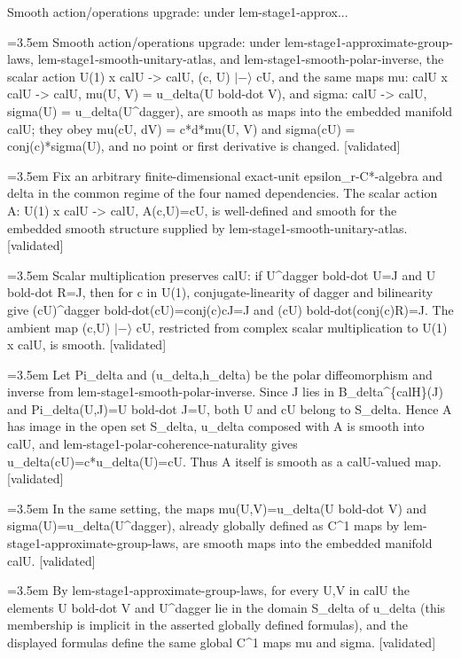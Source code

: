 \documentclass{article}
\newcommand{\step}[1]{\par\noindent\hangindent=3.5em\hangafter=1%
  \makebox[3.5em][l]{\textbf{#1.}}}
\newcommand{\steptag}[1]{\hfill{\small\textsf{[#1]}}}
\begin{document}
\begin{proofbox}{Smooth action/operations upgrade: under lem-stage1-approx...}
\step{1} Smooth action/operations upgrade: under lem-stage1-approximate-group-laws, lem-stage1-smooth-unitary-atlas, and lem-stage1-smooth-polar-inverse, the scalar action U(1) x calU -> calU, (c, U) $|-\rangle$ cU, and the same maps mu: calU x calU -> calU, mu(U, V) = u\_delta(U bold-dot V), and sigma: calU -> calU, sigma(U) = u\_delta(U\textasciicircum{}dagger), are smooth as maps into the embedded manifold calU; they obey mu(cU, dV) = c*d*mu(U, V) and sigma(cU) = conj(c)*sigma(U), and no point or first derivative is changed. \steptag{validated} \\[6pt]
\step{1.1} Fix an arbitrary finite-dimensional exact-unit epsilon\_r-C*-algebra and delta in the common regime of the four named dependencies. The scalar action A: U(1) x calU -> calU, A(c,U)=cU, is well-defined and smooth for the embedded smooth structure supplied by lem-stage1-smooth-unitary-atlas. \steptag{validated} \\[6pt]
\step{1.1.1} Scalar multiplication preserves calU: if U\textasciicircum{}dagger bold-dot U=J and U bold-dot R=J, then for c in U(1), conjugate-linearity of dagger and bilinearity give (cU)\textasciicircum{}dagger bold-dot(cU)=conj(c)cJ=J and (cU) bold-dot(conj(c)R)=J. The ambient map (c,U) $|-\rangle$ cU, restricted from complex scalar multiplication to U(1) x calU, is smooth. \steptag{validated} \\[4pt]
\step{1.1.2} Let Pi\_delta and (u\_delta,h\_delta) be the polar diffeomorphism and inverse from lem-stage1-smooth-polar-inverse. Since J lies in B\_delta\textasciicircum{}\{calH\}(J) and Pi\_delta(U,J)=U bold-dot J=U, both U and cU belong to S\_delta. Hence A has image in the open set S\_delta, u\_delta composed with A is smooth into calU, and lem-stage1-polar-coherence-naturality gives u\_delta(cU)=c*u\_delta(U)=cU. Thus A itself is smooth as a calU-valued map. \steptag{validated} \\[4pt]
\step{1.2} In the same setting, the maps mu(U,V)=u\_delta(U bold-dot V) and sigma(U)=u\_delta(U\textasciicircum{}dagger), already globally defined as C\textasciicircum{}1 maps by lem-stage1-approximate-group-laws, are smooth maps into the embedded manifold calU. \steptag{validated} \\[6pt]
\step{1.2.1} By lem-stage1-approximate-group-laws, for every U,V in calU the elements U bold-dot V and U\textasciicircum{}dagger lie in the domain S\_delta of u\_delta (this membership is implicit in the asserted globally defined formulas), and the displayed formulas define the same global C\textasciicircum{}1 maps mu and sigma. \steptag{validated} \\[4pt]

\end{proofbox}
\end{document}

